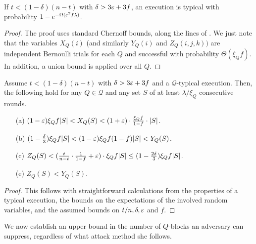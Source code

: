 \begin{theorem}\label{theorem:alltypical}%
	If $t<(1-\delta)(n-t)$ with $\delta>3\varepsilon+3f$,
	an execution is typical with probability $1-e^{-\Omega(\varepsilon^2f\lambda)}$.
\end{theorem}
\begin{proof}
	The proof uses standard Chernoff bounds, along the lines of \cite{backbone-new}.
	We just note that the variables $X_Q(i)$ (and similarly $Y_Q(i)$ and
	$Z_Q(i,j,k))$ are independent Bernoulli trials for each $Q$ and successful
	with probability $\Theta(\xi_Qf)$. In addition, a union bound is applied
	over all $Q$.
\end{proof}%

\begin{lemma}\label{lemma:typical}%
	Assume $t<(1-\delta)(n-t)$ with $\delta>3\varepsilon+3f$ and a $\mathcal{Q}$-typical
	execution.
	Then, the following hold for any $Q\in\mathcal{Q}$ and any set $S$ of at least
	$\lambda/\xi_Q$ consecutive rounds.
	\begin{itemize}
	\item[(a)]
		$(1-\varepsilon)\xi_Qf|S|<X_Q(S)<(1+\varepsilon)\cdot\frac{\xi_Qf}{1-f}\cdot|S|$.
	\item[(b)]
			$(1-\frac\delta3)\xi_Qf|S|<(1-\varepsilon)\xi_Qf(1-f)|S|<Y_Q(S)$.
	\item[(c)]
		$Z_Q(S)<(\frac t{n-t}\cdot\frac1{1-f}+\varepsilon)\cdot\xi_Qf|S|
			\leq(1-\frac{2\delta}3)\xi_Qf|S|$.
	\item[(e)] $Z_Q(S)<Y_Q(S)$.
	\end{itemize}
\end{lemma}
\begin{proof}
	This follows with straightforward calculations from the properties of
	a typical execution, the bounds
	on the expectations of the involved random variables, and the assumed bounds
	on $t/n,\delta,\varepsilon$ and $f$.
\end{proof}

We now establish an upper bound in the number of
$Q$-blocks an adversary can suppress, regardless of what attack method she
follows.

